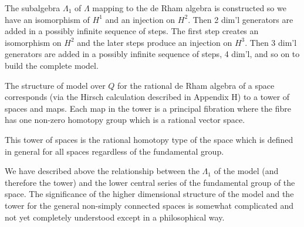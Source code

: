 The subalgebra $\Lambda_1$ of $\Lambda$ mapping to the de Rham algebra is constructed so we have an isomorphism of $H^1$ and an injection on $H^2$. Then 2 dim'l generators are added in a possibly infinite sequence of steps. The first step creates an isomorphism on $H^2$ and the later steps produce an injection on $H^3$. Then 3 dim'l generators are added in a possibly infinite sequence of steps, 4 dim'l, and so on to build the complete model.

The structure of model over $Q$ for the rational de Rham algebra of a space corresponds (via the Hirsch calculation described in Appendix H) to a tower of spaces and maps. Each map in the tower is a principal fibration where the fibre has one non-zero homotopy group which is a rational vector space.

This tower of spaces is the rational homotopy type of the space which is defined in general for all spaces regardless of the fundamental group.

We have described above the relationship between the $\Lambda_1$ of the model (and therefore the tower) and the lower central\unsure{:} series of the fundamental group of the space. The significance of the higher dimensional structure of the model and the tower for the general non-simply connected spaces\unsure{\textperiodcentered} is somewhat complicated and not yet completely understood except in a philosophical way.
